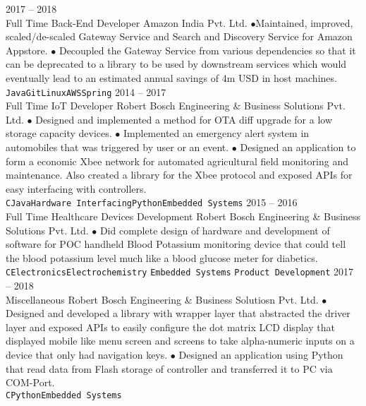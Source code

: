\documentclass[9pt]{developercv} %
\begin{document}
\begin{entrylist}
	\entry
		{2017 -- 2018\\\footnotesize{Full Time}}
		{Back-End Developer}
		{Amazon India Pvt. Ltd.}
		{$\bullet$Maintained,  improved, scaled/de-scaled  Gateway Service and Search and Discovery Service for Amazon Appstore. $\bullet$ Decoupled the Gateway Service from various dependencies so that it can be deprecated to a library to be used by downstream services which would eventually lead to an estimated annual savings of 4m USD in host machines.\\ \texttt{Java}\slashsep\texttt{Git}\slashsep\texttt{Linux}\slashsep\texttt{AWS}\slashsep\texttt{Spring}}
	\entry
		{2014 -- 2017\\\footnotesize{Full Time}}
		{IoT Developer}
		{Robert Bosch Engineering \& Business Solutions Pvt. Ltd.}
		{ $\bullet$ Designed and implemented a method for OTA diff upgrade for a low storage capacity devices. $\bullet$ Implemented an emergency alert system in automobiles that was triggered by user or an event. $\bullet$  Designed an application to form a economic Xbee network for automated agricultural field monitoring and maintenance. Also created a library for the Xbee protocol and exposed APIs for easy interfacing with controllers. \\ \texttt{C}\slashsep\texttt{Java}\slashsep\texttt{Hardware Interfacing}\slashsep\texttt{Python}\slashsep\texttt{Embedded Systems}}
	\entry
		{2015 -- 2016\\\footnotesize{Full Time}}
		{Healthcare Devices Development}
		{Robert Bosch Engineering  \& Business Solutions  Pvt. Ltd.}
		{$\bullet$ Did complete design of hardware and development of software for POC handheld Blood Potassium monitoring device that could tell the blood potassium level much like a blood glucose meter for diabetics. \\ \texttt{C}\slashsep\texttt{Electronics}\slashsep\texttt{Electrochemistry} \slashsep\texttt{Embedded Systems} \slashsep\texttt{Product Development}}
\entry
		{2017 -- 2018\\\footnotesize{}}
		{Miscellaneous}
		{Robert Bosch Engineering  \& Business Solutiosn  Pvt. Ltd.}
		{$\bullet$ Designed and developed a library with wrapper layer that abstracted  the driver layer and exposed APIs to easily configure the dot matrix LCD display that displayed mobile like menu screen and screens to take alpha-numeric inputs on a device that only had navigation keys. $\bullet$ Designed an application using Python that read data from Flash storage of controller and transferred it to PC via COM-Port. \\ \texttt{C}\slashsep\texttt{Python}\slashsep\texttt{Embedded Systems}}
\end{entrylist}
\end{document}
